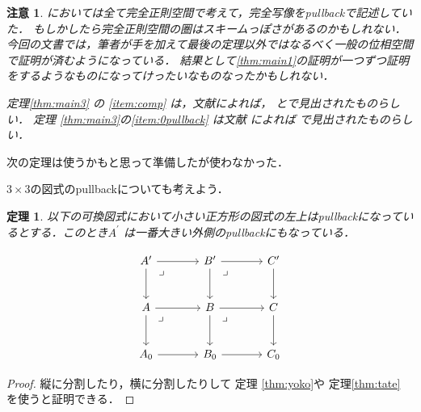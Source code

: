 \documentclass[leqno, a4paper, 12pt, dvipdfmx]{jsarticle}
\newtheorem{thm}{定理}
\newtheorem*{rmk}{注意}
\begin{document}
\begin{rmk}
\cite{com}においては全て完全正則空間で考えて，完全写像をpullbackで記述していた．
もしかしたら完全正則空間の圏はスキームっぽさがあるのかもしれない．今回の文書では，筆者が手を加えて最後の定理以外ではなるべく一般の位相空間で証明が済むようになっている．
結果として\ref{thm:main1}の証明が一つずつ証明をするようなものになってけったいなものなったかもしれない．

定理\ref{thm:main3}
の
\ref{item:comp}
は，文献\cite{mic}によれば，
\cite[Theorem 1]{nag}と\cite[Theorem, p.21]{van}で見出されたものらしい．
定理
\ref{thm:main3}の\ref{item:0pullback}
は文献\cite{the}
によれば
\cite[Lemma 1.5]{duk}
で見出されたものらしい．

\end{rmk}

次の定理は使うかもと思って準備したが使わなかった．

$3\times 3$の図式のpullbackについても考えよう．
\begin{thm}\label{thm:3by3}
以下の可換図式において小さい正方形の図式の左上はpullbackになっているとする．このとき$A^{\prime}$
は一番大きい外側のpullbackにもなっている．

\[
\begin{tikzcd}[row sep=large, column sep=large]
A' \arrow[r] \arrow[d]
\arrow[dr, phantom, "\lrcorner", very near start]
& B' \arrow[r] \arrow[d]
\arrow[dr, phantom, "\lrcorner", very near start]
& C' \arrow[d] \\
A \arrow[r] \arrow[d]
\arrow[dr, phantom, "\lrcorner", very near start]
& B \arrow[r] \arrow[d]
\arrow[dr, phantom, "\lrcorner", very near start]
& C \arrow[d] \\
A_0 \arrow[r] & B_0 \arrow[r] & C_0
\end{tikzcd}
\]
\end{thm}
\begin{proof}
縦に分割したり，横に分割したりして
定理
\ref{thm:yoko}や
定理\ref{thm:tate}
を使うと証明できる．
\end{proof}
\end{document}

